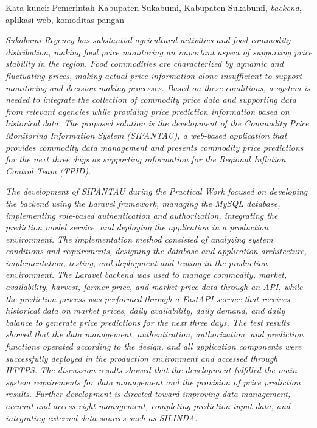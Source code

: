 \documentclass{pkl}
\begin{document}
\vspace{1cm}

\noindent Kata kunci: Pemerintah Kabupaten Sukabumi, Kabupaten Sukabumi, \textit{backend}, aplikasi web, komoditas pangan


\abstraken

\textit{Sukabumi Regency has substantial agricultural activities and food commodity distribution, making food price monitoring an important aspect of supporting price stability in the region. Food commodities are characterized by dynamic and fluctuating prices, making actual price information alone insufficient to support monitoring and decision-making processes. Based on these conditions, a system is needed to integrate the collection of commodity price data and supporting data from relevant agencies while providing price prediction information based on historical data. The proposed solution is the development of the Commodity Price Monitoring Information System (SIPANTAU), a web-based application that provides commodity data management and presents commodity price predictions for the next three days as supporting information for the Regional Inflation Control Team (TPID).}

\textit{The development of SIPANTAU during the Practical Work focused on developing the backend using the Laravel framework, managing the MySQL database, implementing role-based authentication and authorization, integrating the prediction model service, and deploying the application in a production environment. The implementation method consisted of analyzing system conditions and requirements, designing the database and application architecture, implementation, testing, and deployment and testing in the production environment. The Laravel backend was used to manage commodity, market, availability, harvest, farmer price, and market price data through an API, while the prediction process was performed through a FastAPI service that receives historical data on market prices, daily availability, daily demand, and daily balance to generate price predictions for the next three days. The test results showed that the data management, authentication, authorization, and prediction functions operated according to the design, and all application components were successfully deployed in the production environment and accessed through HTTPS. The discussion results showed that the development fulfilled the main system requirements for data management and the provision of price prediction results. Further development is directed toward improving data management, account and access-right management, completing prediction input data, and integrating external data sources such as SILINDA.}
\end{document}
